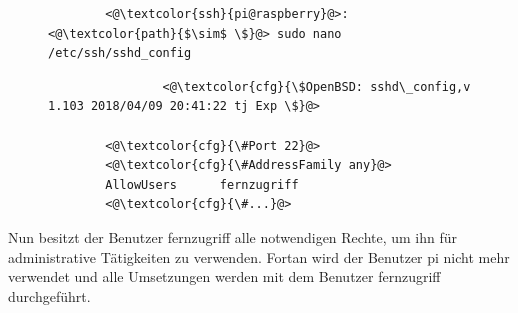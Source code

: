 \documentclass[a4paper, 11pt]{scrartcl}
\begin{document}
\begin{figure}[H]
    \begin{mdframed}[backgroundcolor=bbg]
        \begin{lstlisting}
        <@\textcolor{ssh}{pi@raspberry}@>:<@\textcolor{path}{$\sim$ \$}@> sudo nano /etc/ssh/sshd_config
        \end{lstlisting}
    \end{mdframed}
    \label{lst:nano_sshd_config}
\end{figure}
\begin{figure}[H]
    \begin{mdframed}[backgroundcolor=bbg]
        \begin{lstlisting}
                <@\textcolor{cfg}{\$OpenBSD: sshd\_config,v 1.103 2018/04/09 20:41:22 tj Exp \$}@>    

        <@\textcolor{cfg}{\#Port 22}@>
        <@\textcolor{cfg}{\#AddressFamily any}@>
        AllowUsers      fernzugriff
        <@\textcolor{cfg}{\#...}@>
        \end{lstlisting}
    \end{mdframed}
    \label{lst:fernzugriff_ssh}
\end{figure}
Nun besitzt der Benutzer \glqq fernzugriff\grqq{} alle notwendigen Rechte, um ihn für administrative Tätigkeiten zu verwenden. Fortan wird der Benutzer \glqq pi\grqq{} nicht mehr verwendet und alle
Umsetzungen werden mit dem Benutzer \glqq fernzugriff\grqq{} durchgeführt.
\end{document}
